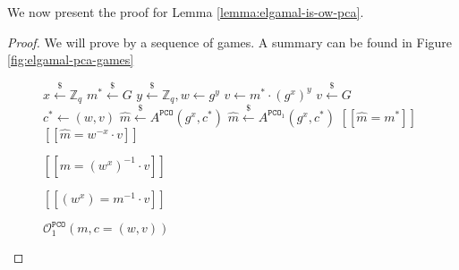 \documentclass[runningheads]{llncs}
\newcommand{\pco}{\texttt{PCO}}
\newcommand{\leftsample}{\stackrel{\$}{\leftarrow}}
\newcommand{\llbrack}{[\![}
\newcommand{\rrbrack}{]\!]}
\begin{document}
We now present the proof for Lemma \ref{lemma:elgamal-is-ow-pca}. 
\begin{proof}
    We will prove by a sequence of games. A summary can be found in Figure \ref{fig:elgamal-pca-games}

    \begin{figure}[h]
        \centering

        \begin{minipage}[t]{0.4\textwidth}
            \begin{algorithm}[H]
                \caption*{$G_0 - G_2$}
                \begin{algorithmic}[1]
                    \State $x \leftsample \mathbb{Z}_q$
                    \State $m^\ast \leftsample G$
                    \State $y \leftsample \mathbb{Z}_q, w \leftarrow g^y$
                    \State $v \leftarrow m^\ast \cdot (g^x)^y$
                    \State $v \leftsample G$
                    \State $c^\ast \leftarrow (w, v)$
                    \State $\hat{m} \leftsample A^{\pco}(g^x, c^\ast)$
                    \State $\hat{m} \leftsample A^{\pco_1}(g^x, c^\ast)$
                    \State \Return $\llbrack \hat{m} = m^\ast \rrbrack$
                    \State \Return $\llbrack \hat{m} = w^{-x}\cdot v \rrbrack$
                \end{algorithmic}
            \end{algorithm}
        \end{minipage}
        \begin{minipage}[t]{0.4\textwidth}
            \begin{algorithm}[H]
                \caption*{$\mathcal{O}^\pco(m, c=(w, v))$}
                \begin{algorithmic}[1]
                    \State \Return $\llbrack m = (w^x)^{-1}\cdot v\rrbrack$
                \end{algorithmic}
            \end{algorithm}
            \begin{algorithm}[H]
                \caption*{$\mathcal{O}^\pco_1(m, c=(w, v))$}
                \begin{algorithmic}[1]
                    \State \Return $\llbrack (w^x) = m^{-1} \cdot v \rrbrack$
                \end{algorithmic}
            \end{algorithm}
        \end{minipage}


\end{figure}
\end{proof}
\end{document}
